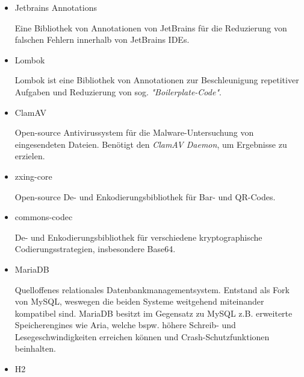 \documentclass{article}
\begin{document}
\begin{itemize}
\item Jetbrains Annotations
\begin{itemize}
Eine Bibliothek von Annotationen von JetBrains für die Reduzierung von falschen Fehlern innerhalb von JetBrains IDEs. 
\end{itemize}
\item Lombok
\begin{itemize}
Lombok ist eine Bibliothek von Annotationen zur Beschleunigung repetitiver Aufgaben und Reduzierung von sog. \textit{"Boilerplate-Code"}.
\end{itemize}
\item ClamAV
\begin{itemize}
Open-source Antivirussystem für die Malware-Untersuchung von eingesendeten Dateien. Benötigt den \textit{ClamAV Daemon}, um Ergebnisse zu erzielen.
\end{itemize}
\item zxing-core
\begin{itemize}
Open-source De- und Enkodierungsbibliothek für Bar- und QR-Codes.
\end{itemize}
\item commons-codec
\begin{itemize}
De- und Enkodierungsbibliothek für verschiedene kryptographische Codierungsstrategien, insbesondere Base64.
\end{itemize}
\break
\item MariaDB
\begin{itemize}
Quelloffenes relationales Datenbankmanagementsystem. Entstand als Fork von MySQL, weswegen die beiden Systeme weitgehend miteinander kompatibel sind. MariaDB besitzt im Gegensatz zu MySQL z.B. erweiterte Speicherengines wie Aria, welche bspw. höhere Schreib- und Lesegeschwindigkeiten erreichen können und Crash-Schutzfunktionen beinhalten.
\end{itemize}
\item H2
\end{itemize}
\end{document}
